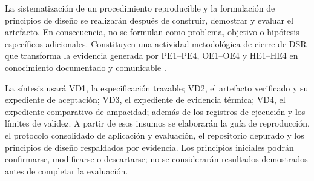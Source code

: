 \documentclass[11pt,a4paper,oneside]{report}
\begin{document}
La sistematización de un procedimiento reproducible y la formulación de principios de diseño se realizarán después de construir, demostrar y evaluar el artefacto. En consecuencia, no se formulan como problema, objetivo o hipótesis específicos adicionales. Constituyen una actividad metodológica de cierre de DSR que transforma la evidencia generada por PE1--PE4, OE1--OE4 y HE1--HE4 en conocimiento documentado y comunicable \parencites[55--56]{peffers2007}[342--350]{gregor2013}.

La síntesis usará VD1, la especificación trazable; VD2, el artefacto verificado y su expediente de aceptación; VD3, el expediente de evidencia térmica; VD4, el expediente comparativo de ampacidad; además de los registros de ejecución y los límites de validez. A partir de esos insumos se elaborarán la guía de reproducción, el protocolo consolidado de aplicación y evaluación, el repositorio depurado y los principios de diseño respaldados por evidencia. Los principios iniciales podrán confirmarse, modificarse o descartarse; no se considerarán resultados demostrados antes de completar la evaluación.
\end{document}
